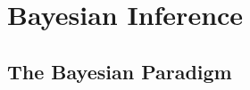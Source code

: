 \chapter{Bayesian Inference}\label{chap:bayesian_chapter}

\section{The Bayesian Paradigm}\label{sec:bayes_paradigm}
